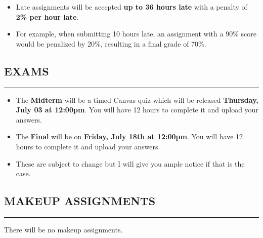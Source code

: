 \begin{itemize}
    \item Late assignments will be accepted \textbf{up to 36 hours late} with a penalty of \textbf{2\% per hour late}.
    \item For example, when submitting 10 hours late, an assignment with a 90\% score would be penalized by 20\%, resulting in a final grade of 70\%.
\end{itemize}

\subsection*{EXAMS}
\vspace*{-0.5cm}
\rule{\textwidth}{2pt}
\begin{itemize}
    \item The \textbf{Midterm} will be a timed Canvas quiz which will be released \textbf{Thursday, July 03 at 12:00pm}. You will have 12 hours to complete it and upload your answers.
    \item The \textbf{Final} will be on \textbf{Friday, July 18th at 12:00pm}. You will have 12 hours to complete it and upload your answers.
    \item These are subject to change but I will give you ample notice if that is the case. 
\end{itemize}

\subsection*{MAKEUP ASSIGNMENTS}
\vspace*{-0.5cm}
\rule{\textwidth}{2pt}

There will be no makeup assignments. 
